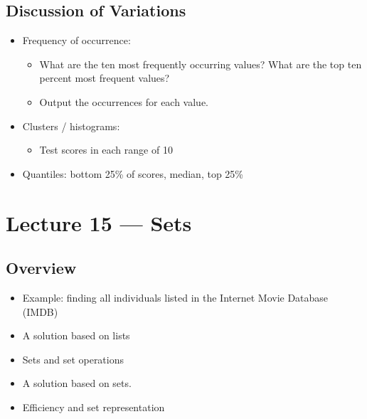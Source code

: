 \documentclass[letterpaper,10pt,english]{sphinxmanual}
\begin{document}
\section{Discussion of Variations}
\label{\detokenize{lecture_notes/lec14_design_part1:discussion-of-variations}}\begin{itemize}
\item {} 
Frequency of occurrence:
\begin{itemize}
\item {} 
What are the ten most frequently occurring values? What are the
top ten percent most frequent values?

\item {} 
Output the occurrences for each value.

\end{itemize}

\item {} 
Clusters / histograms:
\begin{itemize}
\item {} 
Test scores in each range of 10

\end{itemize}

\item {} 
Quantiles: bottom 25\% of scores, median, top 25\%

\end{itemize}


\chapter{Lecture 15 — Sets}
\label{\detokenize{lecture_notes/lec15_sets:lecture-15-sets}}\label{\detokenize{lecture_notes/lec15_sets::doc}}

\section{Overview}
\label{\detokenize{lecture_notes/lec15_sets:overview}}\begin{itemize}
\item {} 
Example: finding all individuals listed in the Internet Movie
Database (IMDB)

\item {} 
A solution based on lists

\item {} 
Sets and set operations

\item {} 
A solution based on sets.

\item {} 
Efficiency and set representation

\end{itemize}
\end{document}
